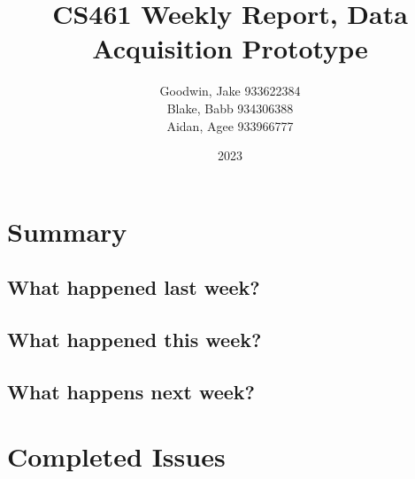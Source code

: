 \documentclass{article}
\title{CS461 Weekly Report, Data Acquisition Prototype}
\author{
    Goodwin, Jake
    933622384\\
    Blake, Babb
    934306388\\
    Aidan, Agee
    933966777
}
\date{2023}
\begin{document}
\maketitle

\section{Summary}


\subsection{What happened last week?}

\subsection{What happened this week?}

\subsection{What happens next week?}


\section{Completed Issues}
\end{document}
